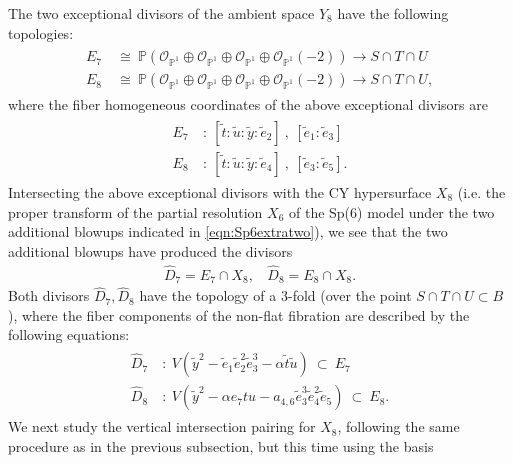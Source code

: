 \documentclass[11pt,oneside,english]{article}
\numberwithin{equation}{section}
\theoremstyle{definition}
\begin{document}
The two exceptional divisors of the ambient space $Y_8$ have the following topologies:
	\begin{align}
	\begin{split}
		{E}_7 ~&\cong ~ \mathbb P( \mathcal O_{\mathbb P^1} \oplus \mathcal O_{\mathbb P^1} \oplus \mathcal O_{\mathbb P^1} \oplus \mathcal O_{\mathbb P^1}(-2) )\rightarrow S \cap T \cap U\\
		{E}_8 ~ &\cong ~ \mathbb P( \mathcal O_{\mathbb P^1} \oplus \mathcal O_{\mathbb P^1} \oplus \mathcal O_{\mathbb P^1} \oplus \mathcal O_{\mathbb P^1}(-2) ) \rightarrow S\cap T \cap U , 
	\end{split}
	\end{align}
where the fiber homogeneous coordinates of the above exceptional divisors are 
	\begin{align}
		\begin{split}
			{E}_7 ~&:~ [ \tilde t: \tilde u : \tilde y : \tilde e_2] ~,~ [\tilde e_1 : \tilde e_3] \\
			{E}_8 ~&:~ [ \tilde t : \tilde u : \tilde y : \tilde e_4] ~,~ [ \tilde e_3 : \tilde e_5]. 
		\end{split}
	\end{align}
Intersecting the above exceptional divisors with the CY hypersurface $ {X}_8$ (i.e. the proper transform of the partial resolution $X_6$ of the Sp(6) model under the two additional blowups indicated in \cref{eqn:Sp6extratwo}), we see that the two additional blowups have produced the divisors 
	\begin{align}
		\hat D_7 = {E}_7 \cap  X_8,~~~~\hat D_8 = {E}_8 \cap  X_8.
	\end{align}
Both divisors $\hat D_7, \hat D_8$ have the topology of a 3-fold (over the point $S \cap T \cap U \subset B$), where the fiber components of the non-flat fibration are described by the following equations:
	\begin{align}
		\begin{split}
			\hat D_7 ~&:~ V(\tilde y^2 - \tilde e_1 \tilde e_2^2 \tilde e_3^3 -\alpha \tilde t \tilde u ) ~\subset~  E_7\\
			\hat D_8 ~&:~ V(\tilde y^2 - \alpha e_7 t u  - a_{4,6} \tilde e_3^3 \tilde e_4^2 \tilde e_5 ) ~ \subset ~  E_8. 
		\end{split}	
	\end{align}
We next study the vertical intersection pairing for $X_8$, following the same procedure as in the previous subsection, but this time using the basis 
\end{document}
